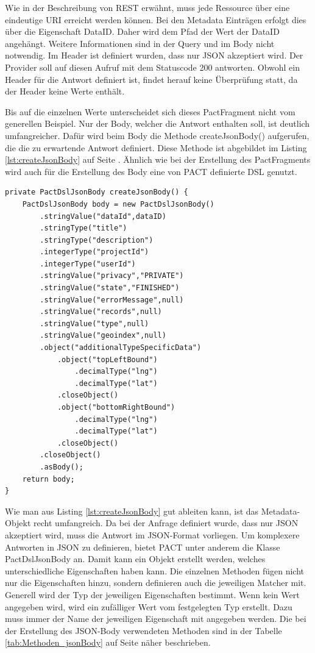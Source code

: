 \documentclass{llncs}
\begin{document}
Wie in der Beschreibung von REST erwähnt, muss jede Ressource über eine eindeutige URI erreicht werden können. Bei den Metadata Einträgen erfolgt dies über die Eigenschaft DataID. Daher wird dem Pfad der Wert der DataID angehängt. Weitere Informationen sind in der Query und im Body nicht notwendig. Im Header ist definiert wurden, dass nur JSON akzeptiert wird.
Der Provider soll auf diesen Aufruf mit dem Statuscode 200 antworten. Obwohl ein Header für die Antwort definiert ist, findet herauf keine Überprüfung statt, da der Header keine Werte enthält. 

Bis auf die einzelnen Werte unterscheidet sich dieses PactFragment nicht vom generellen Beispiel. Nur der Body, welcher die Antwort enthalten soll, ist deutlich umfangreicher. Dafür wird beim Body die Methode createJsonBody() aufgerufen, die die zu erwartende Antwort definiert. Diese Methode ist abgebildet im Listing \ref{lst:createJsonBody} auf Seite \pageref{lst:createJsonBody}. Ähnlich wie bei der Erstellung des PactFragments wird auch für die Erstellung des Body eine von PACT definierte DSL genutzt.

\lstset{language = Java}
\begin{lstlisting}[caption=Erstellung eines JSON-Body,label={lst:createJsonBody}]
private PactDslJsonBody createJsonBody() {
    PactDslJsonBody body = new PactDslJsonBody()
        .stringValue("dataId",dataID)
        .stringType("title")
        .stringType("description")
        .integerType("projectId")
        .integerType("userId")
        .stringValue("privacy","PRIVATE")
        .stringValue("state","FINISHED")
        .stringValue("errorMessage",null)
        .stringValue("records",null)
        .stringValue("type",null)
        .stringValue("geoindex",null)
        .object("additionalTypeSpecificData")
            .object("topLeftBound")
                .decimalType("lng")
                .decimalType("lat")
            .closeObject()
            .object("bottomRightBound")
                .decimalType("lng")
                .decimalType("lat")
            .closeObject()
        .closeObject()
        .asBody();
    return body;
}
\end{lstlisting}

Wie man aus Listing \ref{lst:createJsonBody} gut ableiten kann, ist das Metadata-Objekt recht umfangreich. Da bei der Anfrage definiert wurde, dass nur JSON akzeptiert wird, muss die Antwort im JSON-Format vorliegen. Um komplexere Antworten in JSON zu definieren, bietet PACT unter anderem die Klasse PactDslJsonBody an. Damit kann ein Objekt erstellt werden, welches unterschiedliche Eigenschaften haben kann. Die einzelnen Methoden fügen nicht nur die Eigenschaften hinzu, sondern definieren auch die jeweiligen Matcher mit. Generell wird der Typ der jeweiligen Eigenschaften bestimmt. Wenn kein Wert angegeben wird, wird ein zufälliger Wert vom festgelegten Typ erstellt. Dazu muss immer der Name der jeweiligen Eigenschaft mit angegeben werden. Die bei der Erstellung des JSON-Body verwendeten Methoden sind in der Tabelle \ref{tab:Methoden_jsonBody} auf Seite \pageref{tab:Methoden_jsonBody} näher beschrieben.
\end{document}
